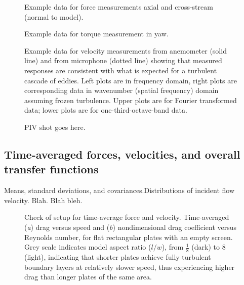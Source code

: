 \begin{figure} 
\caption{Example data for force measurements axial and cross-stream (normal to model).}
\end{figure}

\begin{figure} 
\caption{Example data for torque measurement in yaw.}
\end{figure}

\begin{figure} 


\caption{Example data for velocity measurements from anemometer (solid line) and from microphone (dotted line) showing that measured responses are consistent with what is expected for a turbulent cascade of eddies. Left plots are in frequency domain, right plots are corresponding data in wavenumber (spatial frequency) domain assuming frozen turbulence.  Upper plots are for Fourier transformed data; lower plots are for one-third-octave-band data.}
\end{figure}


\begin{figure} 
\centerline{}
\caption{PIV shot goes here.}
\end{figure}

\eject









\subsection{Time-averaged forces, velocities, and overall transfer functions}
Means, standard deviations, and covariances.Distributions of incident flow velocity. Blah. Blah bleh. 

\begin{figure} 
\caption{Check of setup for time-average force and velocity.  Time-averaged (\textit{a}) drag versus speed and (\textit{b}) nondimensional drag coefficient versus Reynolds number, for flat rectangular plates with an empty screen.  Grey scale indicates model aspect ratio ($l/w$), from $\frac{1}{8}$ (dark) to \num{8} (light), indicating that shorter plates achieve fully turbulent boundary layers at relatively slower speed, thus experiencing higher drag than longer plates of the same area.}
\label{fig:overalldrag}
\end{figure}

